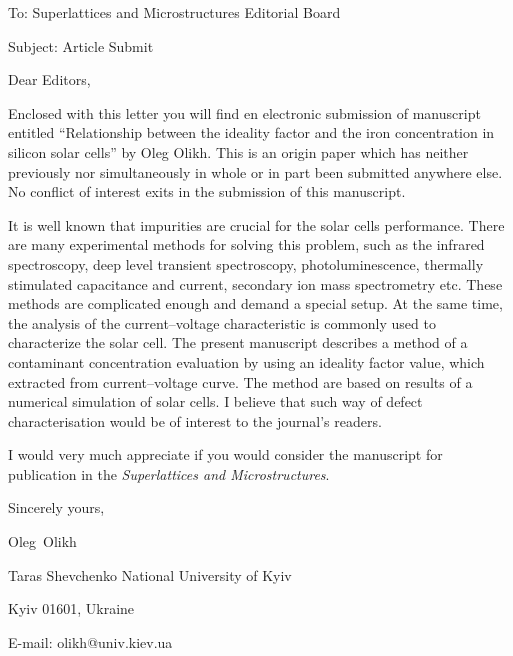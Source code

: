 \documentclass[preprint]{elsarticle}
\begin{document}
To:
Superlattices and Microstructures Editorial Board


Subject:
Article Submit

\vspace{5mm}
Dear Editors,

\vspace{3mm}
Enclosed with this letter you will find en electronic submission of manuscript entitled
``Relationship between the ideality factor and the iron concentration in silicon solar cells'' by Oleg Olikh.
This is an origin paper which has neither previously nor
simultaneously in whole or in part been submitted anywhere else.
No conflict of interest exits in the submission of this manuscript.

It is well known that impurities are crucial for the solar cells performance.
There are many experimental methods for solving this problem, such as the infrared spectroscopy, deep level transient spectroscopy, photoluminescence,
thermally stimulated capacitance and current, secondary ion mass spectrometry etc.
These methods are complicated  enough and demand a special setup.
At the same time, the analysis of  the current--voltage  characteristic is commonly used  to characterize the solar cell.
The present manuscript describes a method of a contaminant concentration evaluation by using an ideality factor value, which extracted from current--voltage curve.
The method are based on results of a numerical simulation of solar cells.
I believe that such way of defect characterisation would be of interest to the journal’s readers.



I would  very much appreciate if you would consider the manuscript for publication in the \emph{Superlattices and Microstructures}.

\vspace{3mm}

Sincerely yours,

Oleg~Olikh


Taras Shevchenko National University of Kyiv


Kyiv 01601, Ukraine

E-mail: olikh@univ.kiev.ua


\end{document}
